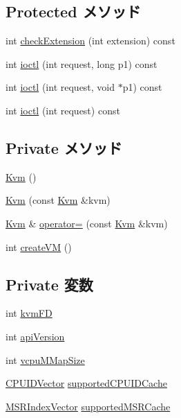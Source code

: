 \subsection*{Protected メソッド}
\begin{DoxyCompactItemize}
\item 
int \hyperlink{classKvm_a8e6e0d0db01a127dd0798b0a87263a29}{checkExtension} (int extension) const 
\item 
int \hyperlink{group__KvmIoctl_ga106fe09b5e87d6c14884f8ffff7b338a}{ioctl} (int request, long p1) const 
\item 
int \hyperlink{group__KvmIoctl_ga89db87cb31fe2ba732de8fa68c8bd1f1}{ioctl} (int request, void $\ast$p1) const 
\item 
int \hyperlink{group__KvmIoctl_ga32cd3b0742689c29c9ab9e3e03feb5f2}{ioctl} (int request) const 
\end{DoxyCompactItemize}
\subsection*{Private メソッド}
\begin{DoxyCompactItemize}
\item 
\hyperlink{classKvm_ac52c88ab9138b51acbd7dedc0b4203ea}{Kvm} ()
\item 
\hyperlink{classKvm_a74d2e5969f68c33262ef78b294a41555}{Kvm} (const \hyperlink{classKvm}{Kvm} \&kvm)
\item 
\hyperlink{classKvm}{Kvm} \& \hyperlink{classKvm_a99c5e2a3a05865b3109843939909b4f6}{operator=} (const \hyperlink{classKvm}{Kvm} \&kvm)
\item 
int \hyperlink{classKvm_acac1d5ae396f1e3fb2804d78bc986db2}{createVM} ()
\end{DoxyCompactItemize}
\subsection*{Private 変数}
\begin{DoxyCompactItemize}
\item 
int \hyperlink{classKvm_af331fe85a8df29abc3f2d301b0afddc2}{kvmFD}
\item 
int \hyperlink{classKvm_ab3562fc781db97a1faac4c863e257ca9}{apiVersion}
\item 
int \hyperlink{classKvm_a0915679bdc25b2c015f15996f6d4ff6d}{vcpuMMapSize}
\item 
\hyperlink{classstd_1_1vector}{CPUIDVector} \hyperlink{classKvm_a3d5dc75656640e2eb3b52c27e4497b75}{supportedCPUIDCache}
\item 
\hyperlink{classstd_1_1vector}{MSRIndexVector} \hyperlink{classKvm_a5553ee613be7488e7c7c28058dc7d487}{supportedMSRCache}
\end{DoxyCompactItemize}
